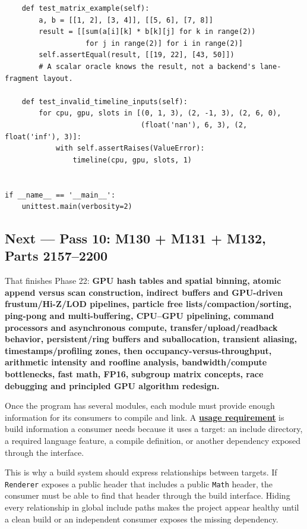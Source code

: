 \begin{verbatim}
    def test_matrix_example(self):
        a, b = [[1, 2], [3, 4]], [[5, 6], [7, 8]]
        result = [[sum(a[i][k] * b[k][j] for k in range(2))
                   for j in range(2)] for i in range(2)]
        self.assertEqual(result, [[19, 22], [43, 50]])
        # A scalar oracle knows the result, not a backend's lane-fragment layout.

    def test_invalid_timeline_inputs(self):
        for cpu, gpu, slots in [(0, 1, 3), (2, -1, 3), (2, 6, 0),
                                (float('nan'), 6, 3), (2, float('inf'), 3)]:
            with self.assertRaises(ValueError):
                timeline(cpu, gpu, slots, 1)


if __name__ == '__main__':
    unittest.main(verbosity=2)
\end{verbatim}

\subsection{Next --- Pass 10: M130 + M131 + M132, Parts 2157--2200}\label{03-visual-computing-i-ch016-next-pass-10-m130-m131-m132-parts-21572200}

\hypertarget{03-visual-computing-i-ch016-next-pass-10-m130-m131-m132-parts-21572200}{}

That finishes Phase 22: \textbf{GPU hash tables and spatial binning, atomic append versus scan construction, indirect buffers and GPU-driven frustum/Hi-Z/LOD pipelines, particle free lists/compaction/sorting, ping-pong and multi-buffering, CPU--GPU pipelining, command processors and asynchronous compute, transfer/upload/readback behavior, persistent/ring buffers and suballocation, transient aliasing, timestamps/profiling zones, then occupancy-versus-throughput, arithmetic intensity and roofline analysis, bandwidth/compute bottlenecks, fast math, FP16, subgroup matrix concepts, race debugging and principled GPU algorithm redesign.}

Once the program has several modules, each module must provide enough information for its consumers to compile and link. A \textbf{\hyperref[appendix-3327b8977adf]{usage requirement}} is build information a consumer needs because it uses a target: an include directory, a required language feature, a compile definition, or another dependency exposed through the interface.

This is why a build system should express relationships between targets. If \texttt{Renderer} exposes a public header that includes a public \texttt{Math} header, the consumer must be able to find that header through the build interface. Hiding every relationship in global include paths makes the project appear healthy until a clean build or an independent consumer exposes the missing dependency.

